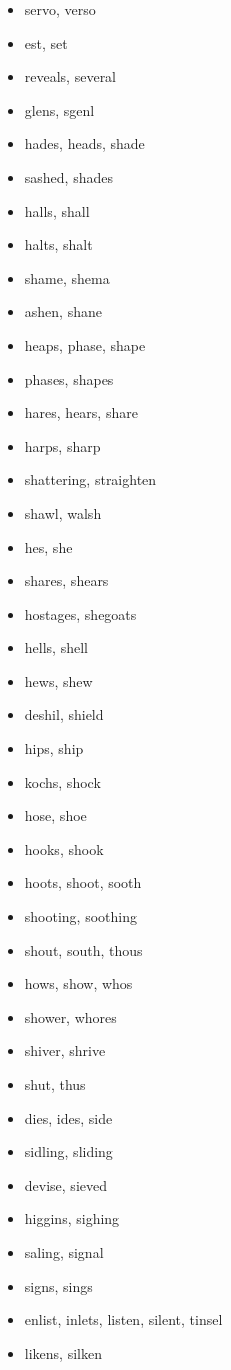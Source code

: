 \documentclass[a4wide,11pt]{report}
\begin{document}
\begin{itemize}
  \item servo, verso
  \item est, set
  \item reveals, several
  \item glens, sgenl
  \item hades, heads, shade
  \item sashed, shades
  \item halls, shall
  \item halts, shalt
  \item shame, shema
  \item ashen, shane
  \item heaps, phase, shape
  \item phases, shapes
  \item hares, hears, share
  \item harps, sharp
  \item shattering, straighten
  \item shawl, walsh
  \item hes, she
  \item shares, shears
  \item hostages, shegoats
  \item hells, shell
  \item hews, shew
  \item deshil, shield
  \item hips, ship
  \item kochs, shock
  \item hose, shoe
  \item hooks, shook
  \item hoots, shoot, sooth
  \item shooting, soothing
  \item shout, south, thous
  \item hows, show, whos
  \item shower, whores
  \item shiver, shrive
  \item shut, thus
  \item dies, ides, side
  \item sidling, sliding
  \item devise, sieved
  \item higgins, sighing
  \item saling, signal
  \item signs, sings
  \item enlist, inlets, listen, silent, tinsel
  \item likens, silken

\end{itemize}
\end{document}
